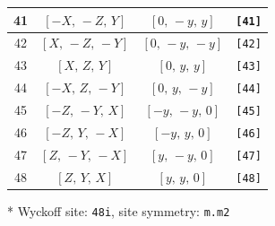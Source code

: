 \documentclass[fleqn,8pt]{jsarticle}
\begin{document}
\begin{longtable}{cccc}
41 & $\left[ - X,\, - Z,\, Y \right]$ & $\left[ 0,\, - y,\, y \right]$ & {\tt [41]} \\ \hline
42 & $\left[ X,\, - Z,\, - Y \right]$ & $\left[ 0,\, - y,\, - y \right]$ & {\tt [42]} \\ \hline
43 & $\left[ X,\, Z,\, Y \right]$ & $\left[ 0,\, y,\, y \right]$ & {\tt [43]} \\ \hline
44 & $\left[ - X,\, Z,\, - Y \right]$ & $\left[ 0,\, y,\, - y \right]$ & {\tt [44]} \\ \hline
45 & $\left[ - Z,\, - Y,\, X \right]$ & $\left[ - y,\, - y,\, 0 \right]$ & {\tt [45]} \\ \hline
46 & $\left[ - Z,\, Y,\, - X \right]$ & $\left[ - y,\, y,\, 0 \right]$ & {\tt [46]} \\ \hline
47 & $\left[ Z,\, - Y,\, - X \right]$ & $\left[ y,\, - y,\, 0 \right]$ & {\tt [47]} \\ \hline
48 & $\left[ Z,\, Y,\, X \right]$ & $\left[ y,\, y,\, 0 \right]$ & {\tt [48]} \\
\end{longtable}
* Wyckoff site: {\tt 48i}, site symmetry: {\tt m.m2}
\renewcommand{\arraystretch}{1.2}
\end{document}
